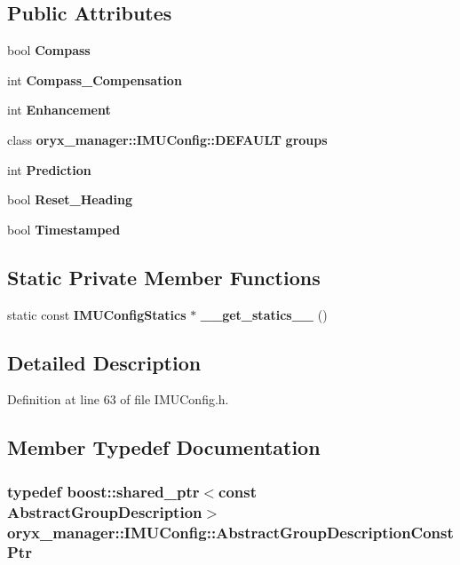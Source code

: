 \subsection*{\-Public \-Attributes}
\begin{DoxyCompactItemize}
\item 
bool {\bf \-Compass}
\item 
int {\bf \-Compass\-\_\-\-Compensation}
\item 
int {\bf \-Enhancement}
\item 
class \*
{\bf oryx\-\_\-manager\-::\-I\-M\-U\-Config\-::\-D\-E\-F\-A\-U\-L\-T} {\bf groups}
\item 
int {\bf \-Prediction}
\item 
bool {\bf \-Reset\-\_\-\-Heading}
\item 
bool {\bf \-Timestamped}
\end{DoxyCompactItemize}
\subsection*{\-Static \-Private \-Member \-Functions}
\begin{DoxyCompactItemize}
\item 
static const {\bf \-I\-M\-U\-Config\-Statics} $\ast$ {\bf \-\_\-\-\_\-get\-\_\-statics\-\_\-\-\_\-} ()
\end{DoxyCompactItemize}


\subsection{\-Detailed \-Description}


\-Definition at line 63 of file \-I\-M\-U\-Config.\-h.



\subsection{\-Member \-Typedef \-Documentation}
\subsubsection[{\-Abstract\-Group\-Description\-Const\-Ptr}]{\setlength{\rightskip}{0pt plus 5cm}typedef boost\-::shared\-\_\-ptr$<$const {\bf \-Abstract\-Group\-Description}$>$ {\bf oryx\-\_\-manager\-::\-I\-M\-U\-Config\-::\-Abstract\-Group\-Description\-Const\-Ptr}}\label{classoryx__manager_1_1IMUConfig_afc6545ea22ba0ef0e4d4f013895f9a51}


